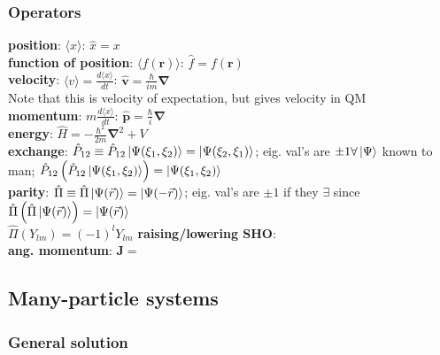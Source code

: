 \documentclass[letterpaper,landscape,10pt]{article}
\begin{document}
{\begin{multicols}{4}
  \subsubsection*{Operators}
  	\hspace{5pt}\textbf{position}: $\langle x \rangle$: $\hat{x} = x$ \\
	\hspace{5pt}\textbf{function of position}: $\langle f(\bm{r})\rangle$: $\hat{f}=f(\bm{r})$ \\
	\hspace{5pt}\textbf{velocity}: $\langle v\rangle=\frac{d\langle x \rangle}{dt}$: $\hat{\bm{v}} = \frac{\hbar}{im}\bm\nabla$ \\
	\hspace{10pt}Note that this is velocity of expectation, but gives velocity in QM\\
	\hspace{5pt}\textbf{momentum}: $m\frac{d\langle x \rangle}{dt}$: $\hat{\bm{p}}=\frac{\hbar}{i}\bm\nabla$ \\
	\hspace{5pt}\textbf{energy}: $\hat H = -\frac{\hbar^2}{2m}\bm\nabla^2+V$ \\
	\hspace{5pt}\textbf{exchange}: $\hat P_{12} \equiv \hat P_{12} \left| \Psi(\xi_1,\xi_2) \right> = \left| \Psi(\xi_2,\xi_1) \right>$; eig. val's are $\pm 1\forall\left| \Psi \right>$ known to man; $\hat P_{12}\left( \hat P_{12} \left| \Psi(\xi_1,\xi_2) \right> \right) = \left| \Psi(\xi_1,\xi_2) \right>$ \\
	\hspace{5pt}\textbf{parity}: $\hat \Pi \equiv \hat \Pi \left| \Psi(\vec{r}) \right> = \left| \Psi(-\vec{r}) \right>$; eig. val's are $\pm 1$ if they $\exists$ since $\hat\Pi \left(\hat\Pi \left| \Psi(\vec{r}) \right>\right) = \left| \Psi(\vec{r}) \right>$ \\
	\hspace{10pt} $\hat\Pi(Y_{lm}) = (-1)^l Y_{lm}$
	\hspace{5pt}\textbf{raising/lowering SHO}:\\
	\hspace{5pt}\textbf{ang. momentum}: $\bm{J} = $ \\

  \subsection*{Many-particle systems}
  	\subsubsection*{General solution}

\end{multicols}}
\end{document}
